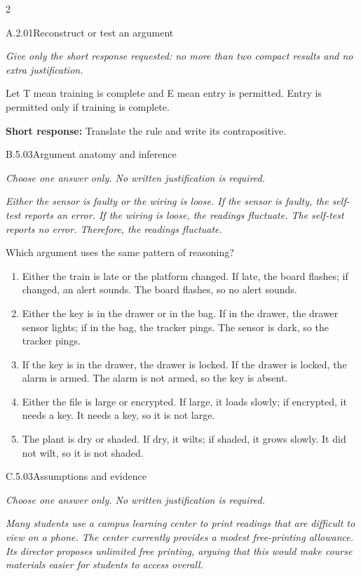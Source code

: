 \documentclass[9pt]{extarticle}
\newcommand{\choice}[1]{\item #1}
\begin{document}
\CoreWorkArea
\FormBreak
{}
\begin{multicols}{2}
\begin{DenseCoreProblem}{A.2.01}{Reconstruct or test an argument}
{\scriptsize\textit{Give only the short response requested: no more than two compact results and no extra justification.}\par}
Let T mean training is complete and E mean entry is permitted. Entry is permitted only if training is complete.

\textbf{Short response:} Translate the rule and write its contrapositive.
\end{DenseCoreProblem}
\begin{DenseCoreProblem}{B.5.03}{Argument anatomy and inference}
{\scriptsize\textit{Choose one answer only. No written justification is required.}\par}
\emph{Either the sensor is faulty or the wiring is loose. If the sensor is faulty, the self-test reports an error. If the wiring is loose, the readings fluctuate. The self-test reports no error. Therefore, the readings fluctuate.}

Which argument uses the same pattern of reasoning?
\begin{enumerate}[label=(\alph*)]
  \choice{Either the train is late or the platform changed. If late, the board flashes; if changed, an alert sounds. The board flashes, so no alert sounds.}
  \choice{Either the key is in the drawer or in the bag. If in the drawer, the drawer sensor lights; if in the bag, the tracker pings. The sensor is dark, so the tracker pings.}
  \choice{If the key is in the drawer, the drawer is locked. If the drawer is locked, the alarm is armed. The alarm is not armed, so the key is absent.}
  \choice{Either the file is large or encrypted. If large, it loads slowly; if encrypted, it needs a key. It needs a key, so it is not large.}
  \choice{The plant is dry or shaded. If dry, it wilts; if shaded, it grows slowly. It did not wilt, so it is not shaded.}
\end{enumerate}
\end{DenseCoreProblem}
\columnbreak
\begin{DenseCoreProblem}{C.5.03}{Assumptions and evidence}
{\scriptsize\textit{Choose one answer only. No written justification is required.}\par}
\emph{Many students use a campus learning center to print readings that are difficult to view on a phone. The center currently provides a modest free-printing allowance. Its director proposes unlimited free printing, arguing that this would make course materials easier for students to access overall.}


\end{DenseCoreProblem}
\end{multicols}
\end{document}
